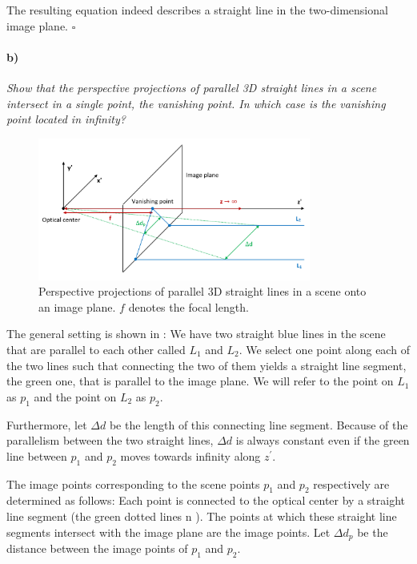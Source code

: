 \documentclass[a4paper,twocolumn]{article}
\newcommand{\subtask}[2]{\paragraph{#1)} \textit{#2} \newline}
\begin{document}
	The resulting equation indeed describes a straight line in the two-dimensional image plane. \hfill $\square$
	
	\subtask{b}{Show that the perspective projections of parallel 3D straight lines in a scene intersect in a single point, the vanishing point. In which case is the vanishing point located in infinity?}
	
	
	\begin{figure}
		\centering
		\includegraphics[width=0.8\textwidth]{images/vanishing_point.png}
		\caption{Perspective projections of parallel 3D straight lines in a scene onto an image plane. $f$ denotes the focal length.}
		\label{fig:vanishing_point}
	\end{figure}
	
	
	The general setting is shown in : We have two straight blue lines in the scene that are parallel to each other called $L_1$ and $L_2$. We select one point along each of the two lines such that connecting the two of them yields a straight line segment, the green one, that is parallel to the image plane. We will refer to the point on $L_1$ as $p_1$ and the point on $L_2$ as $p_2$.
	
	Furthermore, let $\Delta d$ be the length of this connecting line segment. Because of the parallelism between the two straight lines, $\Delta d$ is always constant even if the green line between $p_1$ and $p_2$ moves towards infinity along $z^{\prime}$.
	
	The image points corresponding to the scene points $p_1$ and $p_2$ respectively are determined as follows: Each point is connected to the optical center by a straight line segment (the green dotted lines n ). The points at which these straight line segments intersect with the image plane are the image points. Let $\Delta d_p$ be the distance between the image points of $p_1$ and $p_2$.
	
\end{document}
